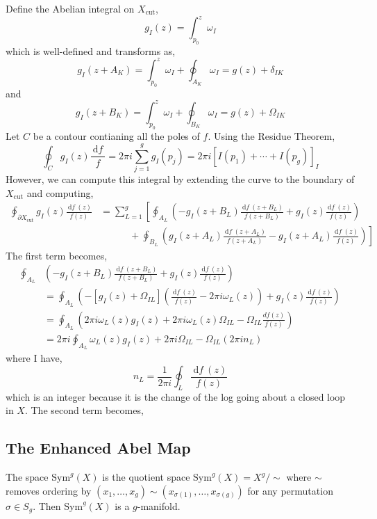 \documentclass[12pt]{extarticle}
\renewcommand{\d}[1]{\: \mathrm{d}#1 \:}
\theoremstyle{definition}
\newenvironment{definition}[1][Definition:]{\begin{trivlist}
\item[\hskip \labelsep {\bfseries #1}]}{\end{trivlist}}
\newcommand{\Xcut}{X_{\text{cut}}}
\begin{document}
Define the Abelian integral on $\Xcut$,
\[ g_I(z) = \int_{p_0}^z \omega_I \]
which is well-defined and transforms as,
\[ g_I(z + A_K) = \int_{p_0}^z \omega_I + \oint_{A_K} \omega_I = g(z) + \delta_{IK} \]
and 
\[ g_I(z + B_K) = \int_{p_0}^z \omega_I + \oint_{B_K} \omega_I = g(z) + \Omega_{IK} \]
Let $C$ be a contour contianing all the poles of $f$. Using the Residue Theorem,
\[ \oint_C g_I(z) \frac{\d{f}}{f} = 2 \pi i \sum_{j = 1}^g g_I(p_j) = 2 \pi i \left[ I(p_1) + \cdots + I(p_g) \right]_I \]
However, we can compute this integral by extending the curve to the boundary of $\Xcut$ and computing,
\begin{align*}
\oint_{\partial \Xcut} g_I(z) \frac{\d{f}(z)}{f(z)} & = \sum_{L = 1}^g \left[ \oint_{A_L} \left(- g_I(z + B_L) \frac{\d{f}(z + B_L)}{f(z + B_L)}  + g_I(z) \frac{\d{f}(z)}{f(z)} \right)
\right.
\\
& \left. \quad \quad \quad + \oint_{B_L} \left( g_I(z + A_L) \frac{\d{f}(z + A_L)}{f(z + A_L)} - g_I(z + A_L) \frac{\d{f}(z)}{f(z)} \right) \right]
\end{align*} 
The first term becomes,
\begin{align*}
\oint_{A_L} & \left(- g_I(z + B_L) \frac{\d{f}(z + B_L)}{f(z + B_L)}  + g_I(z) \frac{\d{f}(z)}{f(z)} \right) 
\\
& = \oint_{A_L} \left(- [ g_I(z) + \Omega_{IL}] \left( \frac{\d{f}(z)}{f(z)} - 2 \pi i \omega_L(z) \right) + g_I(z) \frac{\d{f}(z)}{f(z)} \right)
\\
& = \oint_{A_L} \left( 2 \pi i \omega_L(z) g_I(z) + 2 \pi i \omega_L(z) \Omega_{IL} - \Omega_{IL} \frac{d{f}(z)}{f(z)} \right) 
\\
& = 2 \pi i \oint_{A_L} \omega_L(z) g_I(z) + 2 \pi i \Omega_{IL} - \Omega_{IL} (2 \pi i n_L)
\end{align*}
where I have,
\[ n_L = \frac{1}{2 \pi i} \oint_L \frac{\d{f}(z)}{f(z)} \]
which is an integer because it is the change of the log going about a closed loop in $X$. The second term becomes,

\subsection{The Enhanced Abel Map}

\newcommand{\Sym}[2]{\mathrm{Sym}^{#1}\left(#2\right)}

\begin{definition}
The space $\Sym{g}{X}$ is the quotient space $\Sym{g}{X} = X^g / \sim$ where $\sim$ removes ordering by $(x_1, \dots, x_g) \sim (x_{\sigma(1)}, \dots, x_{\sigma(g)})$ for any permutation $\sigma \in S_g$. Then $\Sym{g}{X}$ is a $g$-manifold. 
\end{definition}
\end{document}
